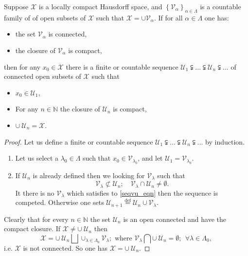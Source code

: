\documentclass{beamer}
\theoremstyle{plain}
\newcommand{\be}{\begin{equation}}
\newcommand{\ee}{\end{equation}}
\newcommand{\sU}{\mathcal{U}}       %
\newcommand{\sV}{\mathcal{V}}       %
\newcommand{\sX}{\mathcal{X}}       %
\newcommand{\N}{\mathbb{N}}                  %
\renewcommand{\a}{\alpha}
\newcommand{\la}{\lambda}
\newcommand{\La}{\Lambda}
\newcommand{\bydef}{\stackrel{\mathrm{def}}{=}}
\begin{document}
\begin{frame}
\begin{lemma}
	Suppose $\sX$ is a locally compact  Hausdorff space, and $\left\{\sV_\a \right\}_{\a \in  \La}$ is a  countable family of  of open subsets of $\sX$ such that  $\sX = \cup \sV_\a$. If for all $\a \in  \La$ one has:
	\begin{itemize}
	\item the set $\sV_\a$ is connected,
	\item the closure of $\sV_\a$ is compact,
\end{itemize}
then for any $x_0 \in \mathcal X$ there is a finite or countable sequence $\sU_1 \subsetneqq  ...\subsetneqq \sU_n\subsetneqq ...$ of connected open subsets of $\sX$ such that
\begin{itemize}
	\item $x_0 \in \sU_1$,
	\item  For any $n \in \N$ the closure of $\sU_n$ is compact,
	\item $\cup~ \sU_n = \sX$.
\end{itemize} 
\end{lemma}
\end{frame}
\begin{frame}
\begin{proof}
	Let us define a finite or countable sequence $\sU_1 \subsetneqq  ...\subsetneqq \sU_n\subsetneqq ...$ by induction.
	\begin{enumerate}
		\item Let us select a $\la_0 \in  \La$ such that $x_0 \in \sV_{\la_0}$, and let $\sU_1 = \sV_{\la_0}$.
		\item If $\sU_n$ is already defined then we looking for $\sV_\la$ such that
		\be\label{seqvu_eqn}
		\sV_\la \not\subset \sU_n;\quad
		\sV_\la \cap \sU_n \neq \emptyset.
		\ee
		It there is no $\sV_\la$ which satisfies to \eqref{seqvu_eqn} then the sequence is competed. Otherwise one sets $\sU_{n+1}\bydef \sU_n \cup \sV_\la$.
	\end{enumerate} 
	Clearly that for every $n \in \N$ the set $ \sU_n$ is an open connected and have the compact closure. If  $\sX \neq \cup~ \sU_n$ then 
	$$
	\sX  = \cup ~\sU_n \bigsqcup \cup_{\la \in  \La_0} \sV_\la; \text{ where } \sV_\la \bigcap \cup ~\sU_n = \emptyset; ~~ \forall \la \in  \La_0,
	$$ 
	i.e. $\sX$ is not connected. So one has $\sX = \cup~ \sU_n$.
\end{proof}

\end{frame}
\end{document}
